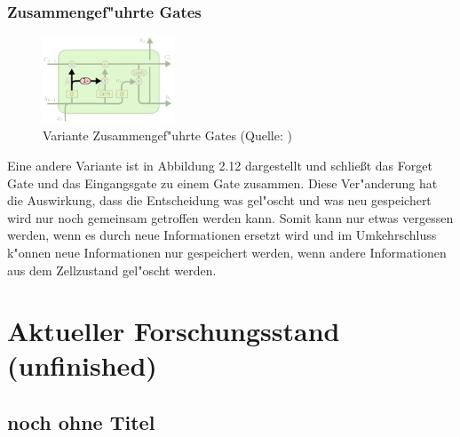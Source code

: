 {\subsubsection{Zusammengef"uhrte Gates}
\begin{figure}
  \vspace{-40pt}
  \begin{center}
    \includegraphics[width=0.35\textwidth]{pictures/LSTM3-var-tied_cut.png}
  \end{center}
  \vspace{-20pt}
  \caption[LSTM Variante: Zusammengef"uhrte Gates]{Variante Zusammengef"uhrte Gates (Quelle: \cite{OlahImg})}
\vspace{-10pt}
\end{figure}
Eine andere Variante ist in Abbildung 2.12 dargestellt und schlie{\ss}t das Forget Gate und das Eingangsgate zu einem Gate zusammen. Diese Ver"anderung hat die Auswirkung, dass die Entscheidung was gel"oscht und was neu gespeichert wird nur noch gemeinsam getroffen werden kann. Somit kann nur etwas vergessen werden, wenn es durch neue Informationen ersetzt wird und im Umkehrschluss k"onnen neue Informationen nur gespeichert werden, wenn andere Informationen aus dem Zellzustand gel"oscht werden.


\section{Aktueller Forschungsstand (unfinished)}

\subsection{noch ohne Titel}

}
